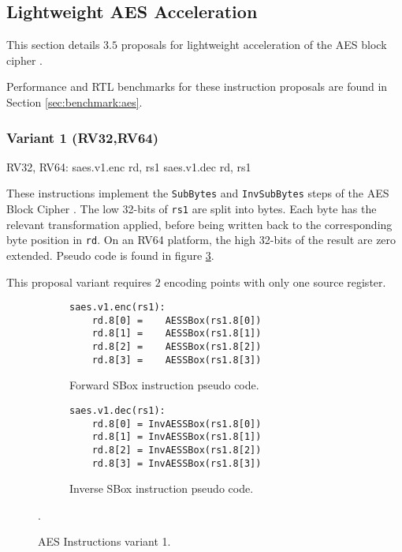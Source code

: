 
\newpage
\subsection{Lightweight AES Acceleration}

This section details $3.5$ proposals for lightweight acceleration of
the AES block cipher \cite{nist:fips:197}.

Performance and RTL benchmarks for these
instruction proposals are found in Section
\ref{sec:benchmark:aes}.


\subsubsection{Variant 1 (RV32,RV64)}

\begin{cryptoisa}
RV32, RV64:
    saes.v1.enc rd, rs1
    saes.v1.dec rd, rs1
\end{cryptoisa}

These instructions implement the 
{\tt SubBytes} \cite[Section 5.1.1]{nist:fips:197}
and
{\tt InvSubBytes} \cite[Section 5.3.1]{nist:fips:197}
steps of the AES Block Cipher \cite{nist:fips:197}.
The low 32-bits of {\tt rs1} are split into bytes.
Each byte has the relevant transformation applied, before
being written back to the corresponding byte position in {\tt rd}.
On an RV64 platform, the high 32-bits of the result are zero
extended.
Pseudo code is found in figure
\ref{fig:pseudo:aes:v1}.

This proposal variant requires $2$ encoding points with only one
source register.

\begin{figure}
\begin{subfigure}[b]{0.5\textwidth}
\begin{lstlisting}[language=pseudo]
saes.v1.enc(rs1):
    rd.8[0] =    AESSBox(rs1.8[0])
    rd.8[1] =    AESSBox(rs1.8[1])
    rd.8[2] =    AESSBox(rs1.8[2])
    rd.8[3] =    AESSBox(rs1.8[3])
\end{lstlisting}
\caption{Forward SBox instruction pseudo code.}
\label{fig:pseudo:aes:v1:sub:enc}
\end{subfigure}
\begin{subfigure}[b]{0.5\textwidth}
\begin{lstlisting}[language=pseudo]
saes.v1.dec(rs1):
    rd.8[0] = InvAESSBox(rs1.8[0])
    rd.8[1] = InvAESSBox(rs1.8[1])
    rd.8[2] = InvAESSBox(rs1.8[2])
    rd.8[3] = InvAESSBox(rs1.8[3])
\end{lstlisting}
\label{fig:pseudo:aes:v1:sub:dec}
\caption{Inverse SBox instruction pseudo code.}
\end{subfigure}
\caption{AES Instructions variant 1.}
\label{fig:pseudo:aes:v1}.
\end{figure}

